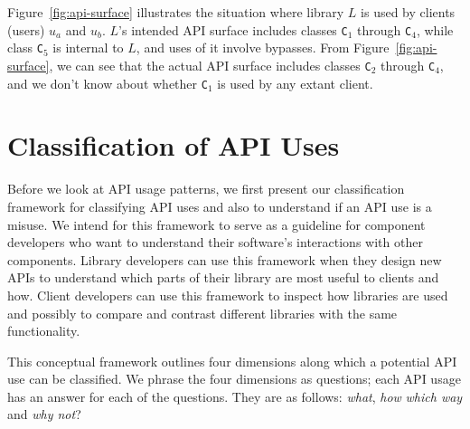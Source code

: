 Figure~\ref{fig:api-surface} illustrates the situation where library
$L$ is used by clients (users) $u_a$ and $u_b$. $L$'s intended API surface
includes classes \texttt{C}$_1$ through \texttt{C}$_4$, while class
\texttt{C}$_5$ is internal to $L$, and uses of it involve bypasses. From Figure~\ref{fig:api-surface},
we can see that the actual API surface includes classes
\texttt{C}$_2$ through \texttt{C}$_4$, and we don't know about whether
\texttt{C}$_1$ is used by any extant client.


\section{Classification of API Uses}
\label{sec:classification}

Before we look at API usage patterns, we first present our classification framework for classifying API uses and also to understand if an API use is a misuse. We intend for this framework to serve as a guideline for component developers who want to understand their software's interactions with other components. Library developers can use this framework when they design new APIs to understand which parts of their library are most useful to clients and how. Client developers can use this framework to inspect how libraries are used and possibly to compare and contrast different libraries with the same functionality.

This conceptual framework outlines four dimensions along which a potential API use can be classified. We phrase the four dimensions as questions; each API usage has an answer for each of the questions. They are as follows: \emph{what}, \emph{how} \emph{which way} and \emph{why not}?

